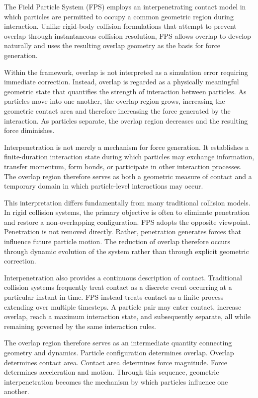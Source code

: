 The Field Particle System (FPS) employs an interpenetrating
contact model in which particles are permitted to occupy a
common geometric region during interaction. Unlike rigid-body
collision formulations that attempt to prevent overlap through
instantaneous collision resolution, FPS allows overlap to
develop naturally and uses the resulting overlap geometry as
the basis for force generation.

Within the framework, overlap is not interpreted as a
simulation error requiring immediate correction. Instead,
overlap is regarded as a physically meaningful geometric
state that quantifies the strength of interaction between
particles. As particles move into one another, the overlap
region grows, increasing the geometric contact area and
therefore increasing the force generated by the interaction.
As particles separate, the overlap region decreases and the
resulting force diminishes.

Interpenetration is not merely a mechanism for force generation. 
It establishes a finite-duration interaction state during which particles 
may exchange information, transfer momentum, form bonds, or participate in 
other interaction processes. The overlap region therefore serves as both a 
geometric measure of contact and a temporary domain in which 
particle-level interactions may occur.

This interpretation differs fundamentally from many
traditional collision models. In rigid collision systems,
the primary objective is often to eliminate penetration and
restore a non-overlapping configuration. FPS adopts the
opposite viewpoint. Penetration is not removed directly.
Rather, penetration generates forces that influence future
particle motion. The reduction of overlap therefore occurs
through dynamic evolution of the system rather than through
explicit geometric correction.

Interpenetration also provides a continuous description of
contact. Traditional collision systems frequently treat
contact as a discrete event occurring at a particular
instant in time. FPS instead treats contact as a finite
process extending over multiple timesteps. A particle pair
may enter contact, increase overlap, reach a maximum
interaction state, and subsequently separate, all while
remaining governed by the same interaction rules.

The overlap region therefore serves as an intermediate
quantity connecting geometry and dynamics. Particle
configuration determines overlap. Overlap determines
contact area. Contact area determines force magnitude.
Force determines acceleration and motion. Through this
sequence, geometric interpenetration becomes the mechanism
by which particles influence one another.

